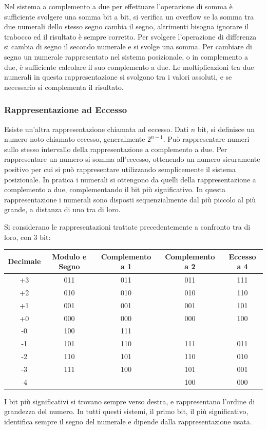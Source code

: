 \documentclass{article}
\numberwithin{equation}{subsection}
\begin{document}
Nel sistema a complemento a due per effettuare l'operazione di somma è sufficiente svolgere una somma bit a bit, si verifica un overflow se la somma tra due numerali dello 
stesso segno cambia il segno, altrimenti bisogna ignorare il trabocco ed il risultato è sempre corretto. Per svolgere l'operazione di differenza si cambia di segno il secondo numerale e si svolge una somma.  
Per cambiare di segno un numerale rappresentato nel sistema posizionale, o in complemento a due, è sufficiente calcolare il suo complemento a due. 
Le moltiplicazioni tra due numerali in questa rappresentazione si svolgono tra i valori assoluti, e se necessario si complementa il risultato. 

\subsubsection{Rappresentazione ad Eccesso}
Esiste un'altra rappresentazione chiamata ad eccesso. Dati $n$ bit, si definisce un numero noto chiamato eccesso, generalmente $2^{n-1}$. Può rappresentare numeri sullo stesso 
intervallo della rappresentazione a complemento a due. Per rappresentare un numero si somma all'eccesso, ottenendo un numero sicuramente positivo per cui si può rappresentare 
utilizzando semplicemente il sistema posizionale. In pratica i numerali si ottengono da quelli della rappresentazione a complemento a due, complementando il bit più significativo. 
In questa rappresentazione i numerali sono disposti sequenzialmente dal più piccolo al più grande, a distanza di uno tra di loro.  


Si considerano le rappresentazioni trattate precedentemente a confronto tra di loro, con 3 bit: 
\begin{center}
    \begin{tabular}{|c||c|c|c|c|}
        \hline
        Decimale & Modulo e Segno & Complemento a 1 & Complemento a 2 & Eccesso a 4\\
        \hline\hline
        +3 & 011 & 011 & 011 & 111 \\
        \hline
        +2 & 010 & 010 & 010 & 110 \\
        \hline
        +1 & 001 & 001 & 001 & 101 \\
        \hline
        +0 & 000 & 000 & 000 & 100 \\
        \hline
        -0 & 100 & 111 & & \\
        \hline
        -1 & 101 & 110 & 111 & 011 \\
        \hline 
        -2 & 110 & 101 & 110 & 010 \\
        \hline
        -3 & 111 & 100 & 101 & 001 \\
        \hline
        -4 & & & 100 & 000 \\
        \hline
    \end{tabular}
\end{center}
I bit più significativi si trovano sempre verso destra, e rappresentano l'ordine di grandezza del numero. In tutti questi sistemi, 
il primo bit, il più significativo, identifica sempre il segno del numerale e dipende dalla rappresentazione usata. 
\end{document}
